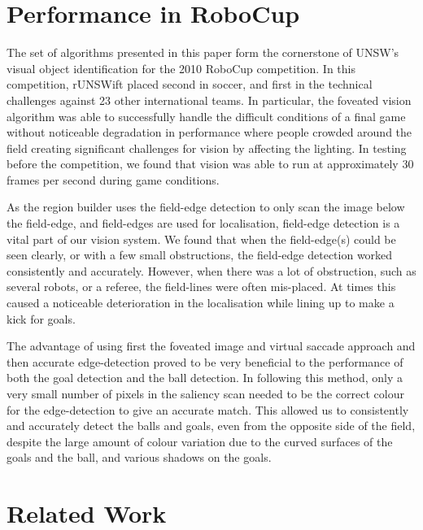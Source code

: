 \documentclass[runningheads,a4paper]{llncs}
\begin{document}

\section{Performance in RoboCup}

The set of algorithms presented in this paper form the cornerstone of UNSW's
visual object identification for the 2010 RoboCup competition. In this
competition, rUNSWift placed second in soccer, and first in the technical
challenges against 23 other international teams. In particular, the foveated
vision algorithm was able to successfully handle the difficult conditions of a
final game  without noticeable degradation in performance where people crowded
around the field creating significant challenges for vision by affecting the
lighting. In testing before the competition, we found that vision was able to
run at approximately 30 frames per second during game conditions.

As the region builder uses the field-edge detection to only scan the image below
the field-edge, and field-edges are used for localisation, field-edge detection
is a vital part of our vision system. We found that when the field-edge(s) could
be seen clearly, or with a few small obstructions, the field-edge detection
worked consistently and accurately. However, when there was a lot of
obstruction, such as several robots, or a referee, the field-lines were often
mis-placed. At times this caused a noticeable deterioration in the localisation
while lining up to make a kick for goals.

The advantage of using first the foveated image and virtual saccade approach
and then accurate edge-detection proved to be very beneficial to the performance
of both the goal detection and the ball detection. In following this method,
only a very small number of pixels in the saliency scan needed to be the correct
colour for the edge-detection to give an accurate match. This allowed us to
consistently and accurately detect the balls and goals, even from the opposite
side of the field, despite the large amount of colour variation due to the
curved surfaces of the goals and the ball, and various shadows on the goals.  


\section{Related Work}
\end{document}
